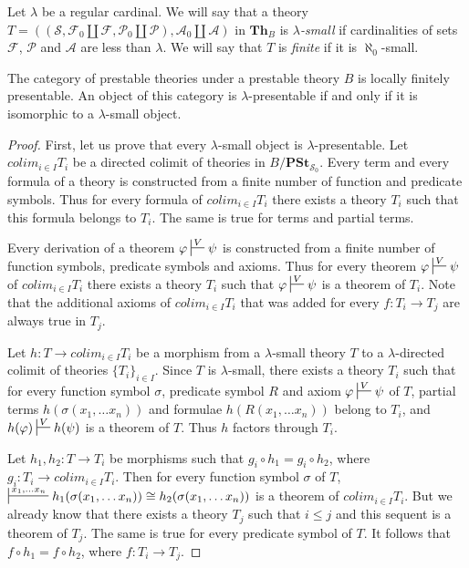 \documentclass[reqno]{amsart}
\theoremstyle{definition}
\theoremstyle{remark}
\newcommand{\cat}[1]{\mathbf{#1}}
\newcommand{\Th}{\cat{Th}}
\newcommand{\PSt}{\cat{PSt}}
\numberwithin{figure}{section}
\begin{document}
Let $\lambda$ be a regular cardinal.
We will say that a theory $T = ((\mathcal{S}, \mathcal{F}_0 \amalg \mathcal{F}, \mathcal{P}_0 \amalg \mathcal{P}), \mathcal{A}_0 \amalg \mathcal{A})$
in $\Th_B$ is \emph{$\lambda$-small} if cardinalities of sets $\mathcal{F}$, $\mathcal{P}$ and $\mathcal{A}$ are less than $\lambda$.
We will say that $T$ is \emph{finite} if it is $\aleph_0$-small.

\begin{prop}
The category of prestable theories under a prestable theory $B$ is locally finitely presentable.
An object of this category is $\lambda$-presentable if and only if it is isomorphic to a $\lambda$-small object.
\end{prop}
\begin{proof}
First, let us prove that every $\lambda$-small object is $\lambda$-presentable.
Let $colim_{i \in I} T_i$ be a directed colimit of theories in $B/\PSt_{\mathcal{S}_0}$.
Every term and every formula of a theory is constructed from a finite number of function and predicate symbols.
Thus for every formula of $colim_{i \in I} T_i$ there exists a theory $T_i$ such that this formula belongs to $T_i$.
The same is true for terms and partial terms.

Every derivation of a theorem $\varphi \sststile{}{V} \psi$ is constructed from a finite number of function symbols, predicate symbols and axioms.
Thus for every theorem $\varphi \sststile{}{V} \psi$ of $colim_{i \in I} T_i$ there exists a theory $T_i$ such that $\varphi \sststile{}{V} \psi$ is a theorem of $T_i$.
Note that the additional axioms of $colim_{i \in I} T_i$ that was added for every $f : T_i \to T_j$ are always true in $T_j$.

Let $h : T \to colim_{i \in I} T_i$ be a morphism from a $\lambda$-small theory $T$ to a $\lambda$-directed colimit of theories $\{ T_i \}_{i \in I}$.
Since $T$ is $\lambda$-small, there exists a theory $T_i$ such that for every function symbol $\sigma$, predicate symbol $R$ and axiom $\varphi \sststile{}{V} \psi$ of $T$,
partial terms $h(\sigma(x_1, \ldots x_n))$ and formulae $h(R(x_1, \ldots x_n))$ belong to $T_i$, and $h(\varphi) \sststile{}{V} h(\psi)$ is a theorem of $T$.
Thus $h$ factors through $T_i$.

Let $h_1,h_2 : T \to T_i$ be morphisms such that $g_i \circ h_1 = g_i \circ h_2$, where $g_i : T_i \to colim_{i \in I} T_i$.
Then for every function symbol $\sigma$ of $T$, $\sststile{}{x_1, \ldots x_n} h_1(\sigma(x_1, \ldots x_n)) \cong h_2(\sigma(x_1, \ldots x_n))$ is a theorem of $colim_{i \in I} T_i$.
But we already know that there exists a theory $T_j$ such that $i \leq j$ and this sequent is a theorem of $T_j$.
The same is true for every predicate symbol of $T$.
It follows that $f \circ h_1 = f \circ h_2$, where $f : T_i \to T_j$.


\end{proof}
\end{document}
